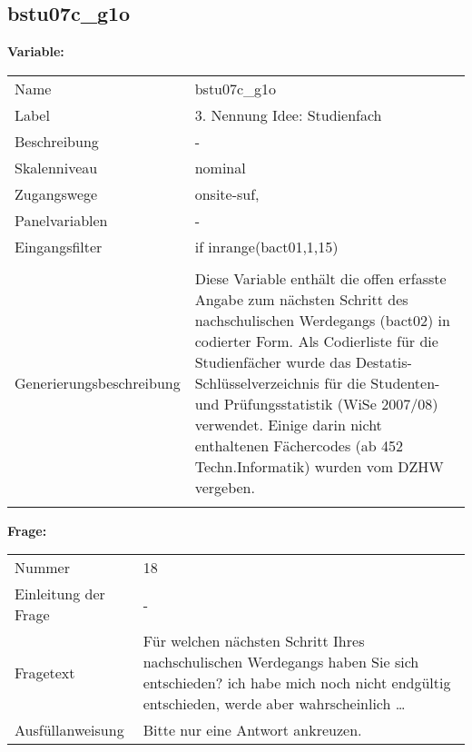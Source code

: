 	
	
	\subsection{bstu07c\_g1o}
	\label{subSection:bstu07c_g1o}

	\noindent\textbf{Variable:}\\
		\begin{tabular}{lL{11.3cm}}
			\label{tableVariable:bstu07c_g1o}
			Name & bstu07c\_g1o \\
			Label & 3. Nennung Idee: Studienfach \\
			Beschreibung & - \\
			Skalenniveau & nominal \\
			Zugangswege &
				onsite-suf,
 \\
			Panelvariablen & -
			 \\
			Eingangsfilter & if inrange(bact01,1,15) \\
 \\
					Generierungsbeschreibung & Diese Variable enthält die offen erfasste Angabe zum nächsten Schritt des nachschulischen Werdegangs (bact02) in codierter Form.  Als Codierliste für die Studienfächer wurde das Destatis-Schlüsselverzeichnis für die Studenten- und Prüfungsstatistik (WiSe 2007/08) verwendet. Einige darin nicht enthaltenen Fächercodes (ab 452 Techn.Informatik) wurden vom DZHW vergeben.
				 \\	
			 \\
		\end{tabular}

		\vspace*{1 cm}
		\noindent\textbf{Frage:}\\
		\begin{tabular}{lL{11.3cm}}
			\label{tableQuestion:bstu07c_g1o}
			Nummer & 18 \\
			Einleitung der Frage & - \\
			Fragetext & Für welchen nächsten Schritt Ihres nachschulischen Werdegangs haben Sie sich entschieden?
ich habe mich noch nicht endgültig entschieden, werde aber wahrscheinlich … \\
			Ausfüllanweisung & Bitte nur eine Antwort ankreuzen. \\
		\end{tabular}





